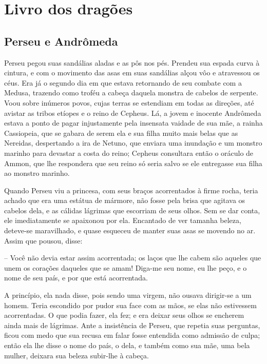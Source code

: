 \pagestyle{plain}
\part{Livro dos dragões}

\chapter{Perseu e Andrômeda}

Perseu pegou suas sandálias aladas e as pôs nos pés. Prendeu sua
espada curva à cintura, e com o movimento das asas em suas sandálias
alçou vôo e atravessou os céus. Era já o segundo dia em que estava
retornando de seu combate com a Medusa, trazendo como troféu a cabeça
daquela monstra de cabelos de serpente. Voou sobre inúmeros povos,
cujas terras se estendiam em todas as direções, até avistar as tribos
etíopes e o reino de Cepheus. Lá, a jovem e inocente Andrômeda estava
a ponto de pagar injustamente pela insensata vaidade de sua mãe, a
rainha Cassiopeia, que se gabara de serem ela e sua filha muito mais
belas que as Nereidas, despertando a ira de Netuno, que enviara uma
inundação e um monstro marinho para devastar a costa do reino;
Cepheus consultara então o oráculo de Ammon, que lhe respondera que
seu reino só seria salvo se ele entregasse sua filha ao monstro
marinho.

Quando Perseu viu a princesa, com seus braços acorrentados à firme
rocha, teria achado que era uma estátua de mármore, não fosse pela
brisa que agitava os cabelos dela, e as cálidas lágrimas que
escorriam de seus olhos. Sem se dar conta, ele imediatamente se
apaixonou por ela. Encantado de ver tamanha beleza, deteve-se
maravilhado, e quase esqueceu de manter suas asas se movendo no ar.
Assim que pousou, disse:

-- Você não devia estar assim acorrentada; os laços que lhe cabem são
aqueles que unem os corações daqueles que se amam! Diga-me seu nome,
eu lhe peço, e o nome de seu país, e por que está acorrentada.

A princípio, ela nada disse, pois sendo uma virgem, não ousava
dirigir-se a um homem. Teria escondido por pudor sua face com as
mãos, se elas não estivessem acorrentadas. O que podia fazer, ela
fez; e era deixar seus olhos se encherem ainda mais de lágrimas. Ante
a insistência de Perseu, que repetia suas perguntas, ficou com medo
que sua recusa em falar fosse entendida como admissão de culpa; então
ela lhe disse o nome do país, o dela, e também como sua mãe, uma bela
mulher, deixara sua beleza subir-lhe à cabeça.

